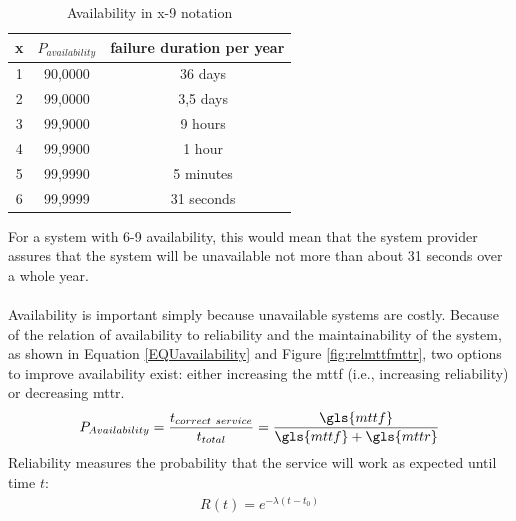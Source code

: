 \begin{table}
\centering
\begin{tabular}{ c | c c  }
  x & $P_{availability}$ & failure duration per year \\ \hline
  1 & 90,0000    & ~ 36 days \\
  2 & 99,0000    & ~ 3,5 days  \\
  3 & 99,9000    & ~ 9 hours \\
  4 & 99,9900    & ~ 1 hour \\
  5 & 99,9990    & ~ 5 minutes \\
  6 & 99,9999    & ~ 31 seconds \\ 
\end{tabular}
\caption{Availability in x-9 notation}
\label{table:x-9}
\end{table}
For a system with 6-9 availability, this would mean that the system provider assures that the system will be unavailable not more than about 31 seconds over a
whole year.
\\
\\
Availability is important simply because unavailable systems are costly. Because of the relation of availability to reliability and the maintainability
of the system, as shown in Equation \ref{EQUavailability} and Figure \ref{fig:relmttfmttr}, two options to improve availability exist: either increasing
the \gls{mttf} (i.e., increasing reliability) or decreasing \gls{mttr}.
\begin{align}\label{EQUavailability}
 P_{Availability} = \frac{t_{correct\ service}}{t_{total}} =  \frac{{\gls{mttf}}}{\gls{mttf}+\gls{mttr}}
\end{align}
Reliability measures the probability that the service will work as expected until time $t$:
\begin{align}\label{expFailLaw}
 R(t) = e^{-\lambda(t-t_0)}
\end{align}
